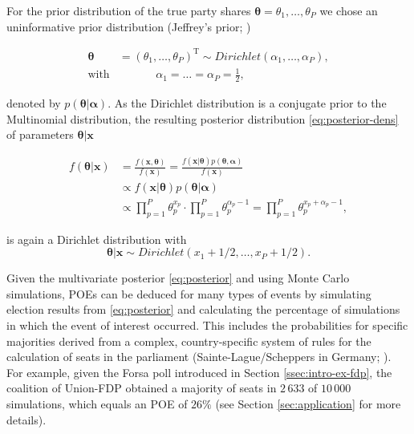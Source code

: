 \documentclass[smallcondensed]{svjour3}     %
\newcommand{\T}{\mathrm{\scriptscriptstyle T}}
\begin{document}
For the prior distribution of the true party shares $\boldsymbol{\theta}=\theta_1,\ldots, \theta_P$
we chose an uninformative prior distribution
(Jeffrey's prior; \citet{gelman_2013})

\begin{equation}\label{eq:prior}
\begin{aligned}
\boldsymbol{\theta} &= (\theta_1,\ldots,\theta_P)^\T \sim Dirichlet(\alpha_1,\ldots,\alpha_P), \\
\text{with} &\ \ \ \ \ \ \ \ \ \ \ \ \ \ \ \alpha_1 = \ldots = \alpha_P = \frac{1}{2},
\end{aligned}
\end{equation}

denoted by $p(\boldsymbol{\theta}|\boldsymbol{\alpha})$.
As the Dirichlet distribution is a conjugate prior to the Multinomial distribution,
the resulting posterior distribution \eqref{eq:posterior-dens}  of parameters $\boldsymbol{\theta}|\mathbf{x}$

\begin{align}
f(\boldsymbol{\theta}|\mathbf{x})
  & = \frac{f(\mathbf{x}, \boldsymbol{\theta})}{f(\mathbf{x})}
    = \frac{f(\mathbf{x}|\boldsymbol{\theta})p(\boldsymbol{\theta}, \boldsymbol{\alpha})}{f(\mathbf{x})}\label{eq:posterior-dens}\\
  & \propto f(\mathbf{x}|\boldsymbol{\theta})p(\boldsymbol{\theta}|\boldsymbol{\alpha})\\
  & \propto \prod_{p=1}^{P}\theta_p^{x_p}\cdot \prod_{p=1}^{P}\theta_p^{\alpha_{p}-1} = \prod_{p=1}^{P}\theta_p^{x_p + \alpha_p-1},
\end{align}

is again a Dirichlet distribution with
\begin{equation}\label{eq:posterior}
\boldsymbol{\theta}|\mathbf{x} \sim Dirichlet(x_1 + 1/2,\ldots, x_P + 1/2).
\end{equation}

Given the multivariate posterior \eqref{eq:posterior} and using Monte Carlo
simulations, POEs can be deduced for many types of events by simulating
election results from \eqref{eq:posterior} and calculating the percentage of
simulations in which the event of interest occurred. This includes the
probabilities for specific majorities derived from a complex, country-specific
system of rules for the calculation of seats in the parliament
(Sainte-Lague/Scheppers in Germany; \citet{grofman_2003}). For example, given the
Forsa poll introduced in Section \ref{ssec:intro-ex-fdp}, the coalition of Union-FDP
obtained a majority of seats in $2\,633$ of $10\,000$ simulations, which equals
an POE of $26\%$ (see Section \ref{sec:application} for more details).\\
\end{document}
